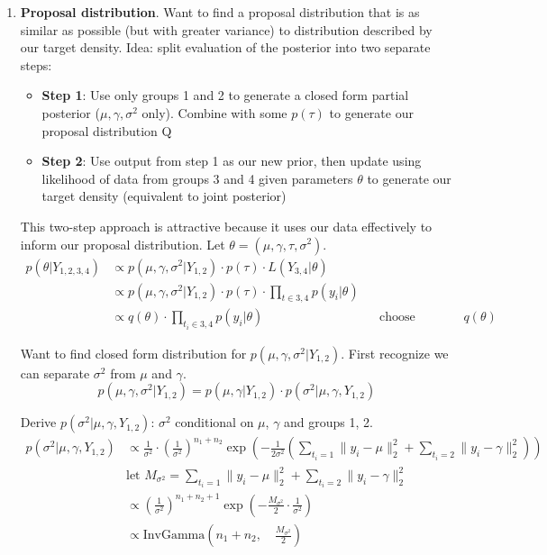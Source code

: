 \documentclass[12pt,letterpaper,twoside]{article}
\begin{document}
\begin{enumerate}[label=(\alph*)]
    \item \textbf{Proposal distribution}. Want to find a proposal distribution that is as similar 
    as possible (but with greater variance) to distribution described by our target density. 
    Idea: split evaluation of the posterior into two separate steps: 
    \begin{itemize}
        \item \textbf{Step 1}: Use only groups 1 and 2 to generate a closed form partial posterior ($\mu, \gamma, \sigma^2$ only). Combine with some $p(\tau)$ to generate our proposal distribution Q
        \item \textbf{Step 2}: Use output from step 1 as our new prior, then update using likelihood of data from groups 3 and 4 given parameters $\theta$ to generate our target density (equivalent to joint posterior) 
    \end{itemize}

    This two-step approach is attractive because it uses our data effectively to inform 
    our proposal distribution. Let $\theta = (\mu, \gamma, \tau, \sigma^2)$.
    \begin{align*}
        p(\theta|Y_{1,2,3,4}) & \propto p(\mu, \gamma, \sigma^2|Y_{1,2}) \cdot p(\tau) \cdot L(Y_{3,4}|\theta) \\
            & \propto p(\mu, \gamma, \sigma^2|Y_{1,2}) \cdot p(\tau) \cdot \prod_{t\in{3,4}} p(y_i|\theta) \\
            & \propto q(\theta) \cdot \prod_{t_i\in{3,4}} p(y_i|\theta) && \text{choose proposal $q(\theta)$}
    \end{align*}

    Want to find closed form distribution for $p(\mu, \gamma, \sigma^2|Y_{1,2})$. 
    First recognize we can separate $\sigma^2$ from $\mu$ and $\gamma$.
    $$ p(\mu, \gamma, \sigma^2|Y_{1,2}) = p(\mu, \gamma|Y_{1,2}) \cdot p(\sigma^2|\mu, \gamma, Y_{1,2}) $$
    
    Derive $p(\sigma^2|\mu, \gamma, Y_{1,2})$: $\sigma^2$ conditional on $\mu$, $\gamma$ and groups 1, 2.
    \begin{align*}
        p(\sigma^2|\mu, \gamma, Y_{1,2}) & \propto \frac{1}{\sigma^2} \cdot \left(\frac{1}{\sigma^2}\right)^{n_1 + n_2} \exp\left(-\frac{1}{2\sigma^2}(\sum_{t_i=1} \|y_i-\mu\|^2_2 + \sum_{t_i=2} \|y_i-\gamma\|^2_2)\right) \\
            & \text{let $M_{\sigma^2}=\sum_{t_i=1} \|y_i-\mu\|^2_2 + \sum_{t_i=2} \|y_i-\gamma\|^2_2$} \\
            & \propto \left(\frac{1}{\sigma^2}\right)^{n_1 + n_2 + 1} \exp\left(-\frac{M_{\sigma^2}}{2} \cdot \frac{1}{\sigma^2}\right) \\
            & \propto \text{InvGamma}\left(n_1+n_2, \quad \frac{M_{\sigma^2}}{2} \right)
    \end{align*}


\end{enumerate}
\end{document}
